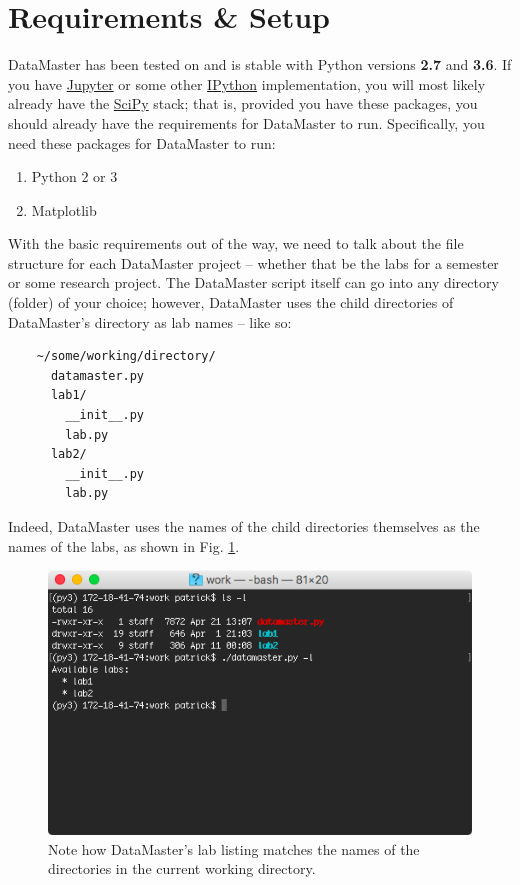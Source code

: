 \documentclass[12pt]{article}
\begin{document}
{
\section*{Requirements \& Setup}
\label{sec:reqs}

DataMaster has been tested on and is stable with Python versions \textbf{2.7} and \textbf{3.6}. If you have \href{http://jupyter.org/}{Jupyter} or some other \href{https://ipython.org/}{IPython} implementation, you will most likely already have the \href{https://www.scipy.org/}{SciPy} stack; that is, provided you have these packages, you should already have the requirements for DataMaster to run. Specifically, you need these packages for DataMaster to run:

\begin{enumerate}[label={\textbf{\arabic*.}}]
  \item Python 2 or 3
  \item Matplotlib
\end{enumerate}

With the basic requirements out of the way, we need to talk about the file structure for each DataMaster project -- whether that be the labs for a semester or some research project. The DataMaster script itself can go into any directory (folder) of your choice; however, DataMaster uses the child directories of DataMaster's directory as lab names -- like so:

\begin{framed}
  \begin{lstlisting}
    ~/some/working/directory/
      datamaster.py
      lab1/
        __init__.py
        lab.py
      lab2/
        __init__.py
        lab.py
    \end{lstlisting}
\end{framed}

Indeed, DataMaster uses the names of the child directories themselves as the names of the labs, as shown in Fig. \ref{fig:req-lablist}.

\begin{figure}[!ht]
  \centering
    \includegraphics[width=5in]{assets/folder-list.png}
  \caption{\textsf{Note how DataMaster's lab listing matches the names of the directories in the current working directory.}}
  \label{fig:req-lablist}
\end{figure}

}
\end{document}
